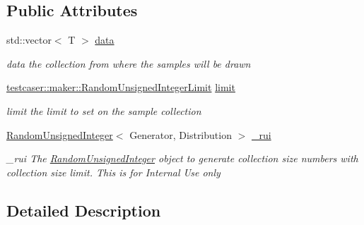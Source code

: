 \subsection*{Public Attributes}
\begin{DoxyCompactItemize}
\item 
\mbox{\label{structtestcaser_1_1maker_1_1types_1_1RandomFrom_a1f346e06890d0451607551dcb0e3a426}} 
std\+::vector$<$ T $>$ \hyperlink{structtestcaser_1_1maker_1_1types_1_1RandomFrom_a1f346e06890d0451607551dcb0e3a426}{data}
\begin{DoxyCompactList}\small\item\em data the collection from where the samples will be drawn \end{DoxyCompactList}\item 
\mbox{\label{structtestcaser_1_1maker_1_1types_1_1RandomFrom_a4701553931d6eafed7f3070fa64924b7}} 
\hyperlink{classtestcaser_1_1maker_1_1RandomUnsignedIntegerLimit}{testcaser\+::maker\+::\+Random\+Unsigned\+Integer\+Limit} \hyperlink{structtestcaser_1_1maker_1_1types_1_1RandomFrom_a4701553931d6eafed7f3070fa64924b7}{limit}
\begin{DoxyCompactList}\small\item\em limit the limit to set on the sample collection \end{DoxyCompactList}\item 
\mbox{\label{structtestcaser_1_1maker_1_1types_1_1RandomFrom_abf3411be34374535dce67aeecabe0e8c}} 
\hyperlink{classtestcaser_1_1maker_1_1types_1_1RandomUnsignedInteger}{Random\+Unsigned\+Integer}$<$ Generator, Distribution $>$ \hyperlink{structtestcaser_1_1maker_1_1types_1_1RandomFrom_abf3411be34374535dce67aeecabe0e8c}{\+\_\+rui}
\begin{DoxyCompactList}\small\item\em \+\_\+rui The \hyperlink{classtestcaser_1_1maker_1_1types_1_1RandomUnsignedInteger}{Random\+Unsigned\+Integer} object to generate collection size numbers with collection size limit. This is for Internal Use only \end{DoxyCompactList}\end{DoxyCompactItemize}


\subsection{Detailed Description}
